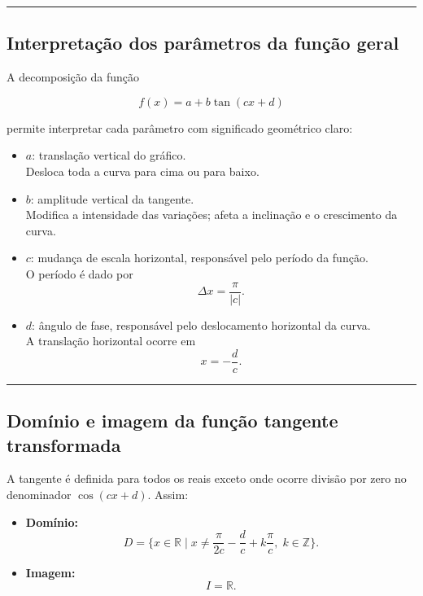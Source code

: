 \documentclass[11pt]{article}
\begin{document}
\begin{center}\rule{0.5\linewidth}{0.5pt}\end{center}

\subsection{Interpretação dos parâmetros da função
geral}\label{interpretauxe7uxe3o-dos-paruxe2metros-da-funuxe7uxe3o-geral}

A decomposição da função

\[
f(x) = a + b \tan(cx + d)
\]

permite interpretar cada parâmetro com significado geométrico claro:

\begin{itemize}
\item
  \textbf{\(a\)}: translação vertical do gráfico.\\
  Desloca toda a curva para cima ou para baixo.
\item
  \textbf{\(b\)}: amplitude vertical da tangente.\\
  Modifica a intensidade das variações; afeta a inclinação e o
  crescimento da curva.
\item
  \textbf{\(c\)}: mudança de escala horizontal, responsável pelo período
  da função.\\
  O período é dado por\\
  \[
  \Delta x = \frac{\pi}{|c|}.
  \]
\item
  \textbf{\(d\)}: ângulo de fase, responsável pelo deslocamento
  horizontal da curva.\\
  A translação horizontal ocorre em\\
  \[
  x = -\frac{d}{c}.
  \]
\end{itemize}

\begin{center}\rule{0.5\linewidth}{0.5pt}\end{center}

\subsection{Domínio e imagem da função tangente
transformada}\label{domuxednio-e-imagem-da-funuxe7uxe3o-tangente-transformada}

A tangente é definida para todos os reais exceto onde ocorre divisão por
zero no denominador \(\cos(cx + d)\). Assim:

\begin{itemize}
\item
  \textbf{Domínio:}\\
  \[
  D = \{x \in \mathbb{R} \;|\; x \neq \frac{\pi}{2c} - \frac{d}{c} + k\frac{\pi}{c},\; k\in\mathbb{Z} \}.
  \]
\item
  \textbf{Imagem:}\\
  \[
  I = \mathbb{R}.
  \]
\end{itemize}
\end{document}
